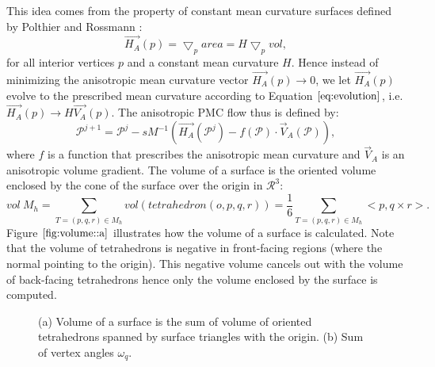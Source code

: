 \documentclass[11pt]{article}
\begin{document}
This idea comes from the property of constant mean curvature surfaces defined by Polthier and Rossmann \cite{PolthierRossmann2002}:
\begin{equation}
\vec{H_A}(p) = \bigtriangledown_p area = H \bigtriangledown_p vol,
\label{eq:evolution}
\end{equation}
for all interior vertices $p$ and a constant mean curvature $H$. Hence instead of minimizing the anisotropic mean curvature vector $\vec{H_A}(p) \rightarrow 0$, we let $\vec{H_A}(p)$ evolve to the prescribed mean curvature according to Equation $\ref{eq:evolution}$, i.e. $\vec{H_A}(p) \rightarrow H\vec{V_A}(p)$. The anisotropic PMC flow thus is defined by:
\begin{equation}
\mathcal{P}^{j+1} = \mathcal{P}^j -sM^{-1}(\vec{H_A}(\mathcal{P}^j) - f(\mathcal{P}) \cdot \vec{V}_A(\mathcal{P})),
\label{eq:pmc}
\end{equation}
where $f$ is a function that prescribes the anisotropic mean curvature and $\vec{V}_A$ is an anisotropic volume gradient. The volume of a surface is the oriented volume enclosed by the cone of the surface over the origin in $\mathcal{R}^3$:
\begin{equation}
vol \ M_h = \sum\limits_{T=(p, q, r) \in M_h}vol(tetrahedron(o, p, q, r)) = \frac{1}{6}\sum\limits_{T=(p, q, r) \in M_h}<p, q \times r>.
\label{eq:volume}
\end{equation}
Figure $\ref{fig:volume::a}$ illustrates how the volume of a surface is calculated. Note that the volume of tetrahedrons is negative in front-facing regions (where the normal pointing to the origin). This negative volume cancels out with the volume of back-facing tetrahedrons hence only the volume enclosed by the surface is computed.

\begin{figure}[htbp]
\centering
\caption{(a) Volume of a surface is the sum of volume of oriented tetrahedrons spanned by surface triangles with the origin. (b) Sum of vertex angles $\omega_q$.}
\label{fig:volume}
\end{figure}
\end{document}
